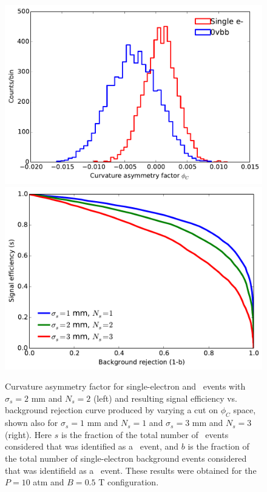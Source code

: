 \documentclass{JINST}
\begin{document}
\begin{figure}[!htb]
	\includegraphics[scale=0.44]{fig/10atm_05T_scurv_diff_means.pdf}
	\includegraphics[scale=0.44]{fig/10atm_05T_sigvsb_all.pdf}
	\caption{\label{fig_svsbg}Curvature asymmetry factor for single-electron and \bbonu\ events with $\sigma_{s} = 2$ mm and $N_{s} = 2$ (left) and resulting signal efficiency vs. background rejection curve produced by varying a cut on $\phi_{C}$ space, shown also for $\sigma_{s} = 1$ mm and $N_{s} = 1$ and $\sigma_{s} = 3$ mm and $N_{s} = 3$ (right).  Here $s$ is the fraction of the total number of \bbonu\ events considered that was identified as a \bbonu\ event, and $b$ is the fraction of the total number of single-electron background events considered that was identifield as a \bbonu\ event.  These results were obtained for the $P = 10$ atm and $B = 0.5$ T configuration.}
\end{figure}
\end{document}
